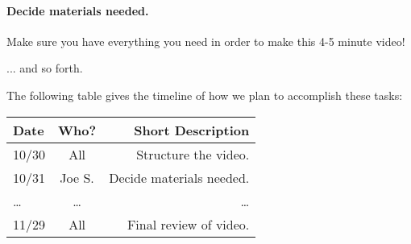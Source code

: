\documentclass[11pt,twocolumn]{article}
\begin{document}
\paragraph{Decide materials needed.}  Make sure you have everything you need in 
order to make this 4-5 minute video!

... and so forth.

The following table gives the timeline of how we plan to accomplish these tasks:

\begin{table}[h!]
\centering
\begin{tabular}{ |l | c | r|}
  \hline
  Date & Who? & Short Description \\
  \hline
  \hline
  10/30 & All & Structure the video. \\
  \hline
  10/31 & Joe S. & Decide materials needed. \\
  \hline
  \ldots & \ldots & \ldots \\
  \hline
  11/29 & All & Final review of video. \\
  \hline
\end{tabular}
\end{table}
\end{document}
